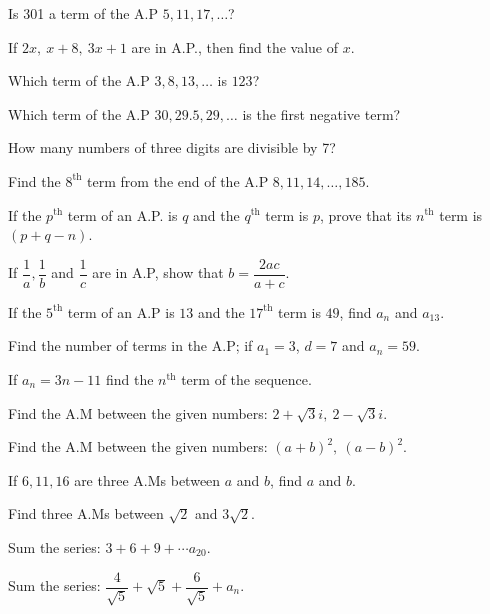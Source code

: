 \documentclass[11pt,a4paper]{article}
\begin{document}
\begin{shortlist}
\item Is 301 a term of the A.P $5,11,17,\ldots$?

\item If $2x,\ x+8,\ 3x+1$ are in A.P., then find the value of $x$.

\item Which term of the A.P $3,8,13,\ldots$ is $123$?

\item Which term of the A.P $30,29.5,29,\ldots$ is the first negative term?

\item How many numbers of three digits are divisible by 7?

\item Find the $8^{\text{th}}$ term from the end of the A.P $8,11,14,\ldots,185$.

\item If the $p^{\text{th}}$ term of an A.P. is $q$ and the $q^{\text{th}}$ term is $p$, prove that its $n^{\text{th}}$ term is $(p+q-n)$.

\item If $\dfrac{1}{a},\dfrac{1}{b}$ and $\dfrac{1}{c}$ are in A.P, show that $b=\dfrac{2ac}{a+c}$.

\item If the $5^{\text{th}}$ term of an A.P is $13$ and the $17^{\text{th}}$ term is $49$, find $a_n$ and $a_{13}$.

\item Find the number of terms in the A.P; if $a_1=3$, $d=7$ and $a_n=59$.

\item If $a_n=3n-11$ find the $n^{\text{th}}$ term of the sequence.

\item Find the A.M between the given numbers: $2+\sqrt{3}i,\ 2-\sqrt{3}i$.

\item Find the A.M between the given numbers: $(a+b)^2,\ (a-b)^2$.

\item If $6,11,16$ are three A.Ms between $a$ and $b$, find $a$ and $b$.

\item Find three A.Ms between $\sqrt{2}$ and $3\sqrt{2}$.

\item Sum the series: $3+6+9+\cdots a_{20}$.

\item Sum the series: $\dfrac{4}{\sqrt{5}}+\sqrt{5}+\dfrac{6}{\sqrt{5}}+a_n$.


\end{shortlist}
\end{document}
